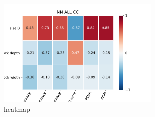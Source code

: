 \begin{figure}[!htbp]
\centering
\includegraphics[width=0.7\textwidth]{figures/comparison_CIFAR10_heatmap_NN_ALL_CC.pdf}
\decoRule
\caption{heatmap}
\label{fig:rec_hyperparameter_heatmap}
\end{figure}




















